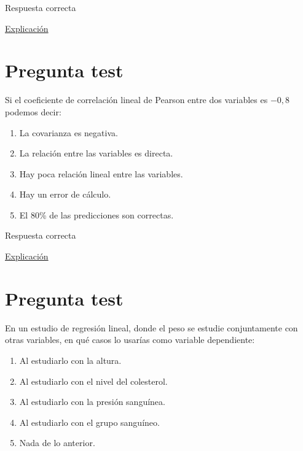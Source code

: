 \documentclass[
]{book}
\providecommand{\tightlist}{%
  \setlength{\itemsep}{0pt}\setlength{\parskip}{0pt}}
\begin{document}
Respuesta correcta

\href{https://smiba.org.ar/curso_medico_especialista/lecturas_2021/e\%29.\%204\%20Correlación\%20y\%20regresión.pdf}{Explicación}

\hypertarget{pregunta-test-126}{%
\section{Pregunta test}\label{pregunta-test-126}}

Si el coeficiente de correlación lineal de Pearson entre dos variables es \(-0,8\) podemos decir:

\begin{enumerate}
\def\labelenumi{\alph{enumi})}
\tightlist
\item
  La covarianza es negativa.
\item
  La relación entre las variables es directa.
\item
  Hay poca relación lineal entre las variables.
\item
  Hay un error de cálculo.
\item
  El 80\% de las predicciones son correctas.
\end{enumerate}

Respuesta correcta

\href{https://1fjmanzano.github.io/bioestadistica/relaci\%C3\%B3n-entre-variables-nume\%CC\%81ricas.html\#coeficiente-de-correlacio\%CC\%81n}{Explicación}

\hypertarget{pregunta-test-127}{%
\section{Pregunta test}\label{pregunta-test-127}}

En un estudio de regresión lineal, donde el peso se estudie conjuntamente con otras variables, en qué casos lo usarías como variable dependiente:

\begin{enumerate}
\def\labelenumi{\alph{enumi})}
\tightlist
\item
  Al estudiarlo con la altura.
\item
  Al estudiarlo con el nivel del colesterol.
\item
  Al estudiarlo con la presión sanguínea.
\item
  Al estudiarlo con el grupo sanguíneo.
\item
  Nada de lo anterior.
\end{enumerate}
\end{document}

